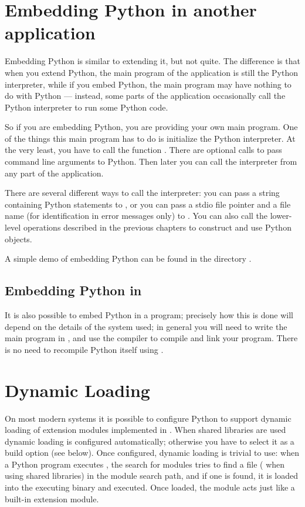 \documentclass[twoside,openright]{report}
\begin{document}
\chapter{Embedding Python in another application}

Embedding Python is similar to extending it, but not quite.  The
difference is that when you extend Python, the main program of the
application is still the Python interpreter, while if you embed
Python, the main program may have nothing to do with Python ---
instead, some parts of the application occasionally call the Python
interpreter to run some Python code.

So if you are embedding Python, you are providing your own main
program.  One of the things this main program has to do is initialize
the Python interpreter.  At the very least, you have to call the
function .  There are optional calls to pass command
line arguments to Python.  Then later you can call the interpreter
from any part of the application.

There are several different ways to call the interpreter: you can pass
a string containing Python statements to ,
or you can pass a stdio file pointer and a file name (for
identification in error messages only) to .  You
can also call the lower-level operations described in the previous
chapters to construct and use Python objects.

A simple demo of embedding Python can be found in the directory
.


\section{Embedding Python in \Cpp{}}

It is also possible to embed Python in a \Cpp{} program; precisely how this
is done will depend on the details of the \Cpp{} system used; in general you
will need to write the main program in \Cpp{}, and use the \Cpp{} compiler
to compile and link your program.  There is no need to recompile Python
itself using \Cpp{}.


\chapter{Dynamic Loading}

On most modern systems it is possible to configure Python to support
dynamic loading of extension modules implemented in \C{}.  When shared
libraries are used dynamic loading is configured automatically;
otherwise you have to select it as a build option (see below).  Once
configured, dynamic loading is trivial to use: when a Python program
executes , the search for modules tries to find a
file  ( when using shared
libraries) in the module search path, and if one is found, it is
loaded into the executing binary and executed.  Once loaded, the
module acts just like a built-in extension module.
\end{document}
